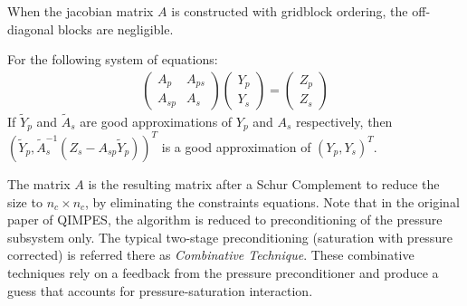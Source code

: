 \begin{assumption}
	When the jacobian matrix $A$ is constructed with gridblock ordering, the off-diagonal blocks are negligible.
\end{assumption}

\begin{assumption}
	For the following system of equations:
	\begin{align}
		\begin{pmatrix}
			A_{p}&A_{ps}\\
			A_{sp}&A_{s}
		\end{pmatrix} 
		\begin{pmatrix}
			Y_{p}\\
			Y_{s}
		\end{pmatrix} 
		= 
		\begin{pmatrix}
			Z_{p}\\
			Z_{s}
		\end{pmatrix} 
	\end{align}
	If $\tilde{Y}_{p}$ and $\tilde{A}_{s}$ are good approximations of $Y_{p}$ and $A_{s}$ respectively,
	then $(\tilde{Y}_{p}, \tilde{A}_{s}^{-1}(Z_{s}-A_{sp}\tilde{Y}_{p}))^{T}$ is a good approximation of $(Y_{p}, Y_{s})^{T}$.
\end{assumption}

The matrix $A$ is the resulting matrix after a Schur Complement to reduce the size to $n_{c}\times n_{c}$, by eliminating the constraints equations.
Note that in the original paper of QIMPES, the algorithm is reduced to preconditioning of the pressure subsystem only. The typical two-stage preconditioning
(saturation with pressure corrected) is referred there as \textit{Combinative Technique}. These combinative techniques rely on a feedback from the pressure preconditioner
and produce a guess that accounts for pressure-saturation interaction.

